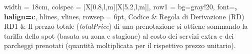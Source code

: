 \documentclass[border=10pt]{standalone}
\begin{document}
\begin{tblr}{
  width = 18cm,
  colspec = {|X[0.8,l,m]|X[5.2,l,m]|},
  row{1} = {bg=gray!20, font=\bfseries, halign=c},
  hlines, vlines,
  rowsep = 6pt,
}
    Codice & Regola di Derivazione (RD) \\
    RD1 & Il prezzo totale (\textit{totalPrice}) di una prenotazione si ottiene sommando la tariffa dello spot (basata su zona e stagione) al costo dei servizi extra e dei parcheggi prenotati (quantità moltiplicata per il rispettivo prezzo unitario). \\
\end{tblr}
\end{document}
